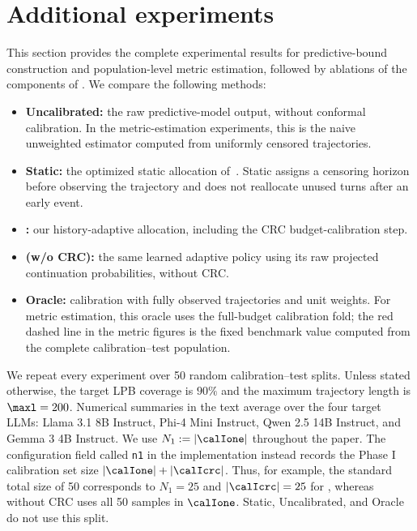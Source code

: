 \section{Additional experiments}
\label{sec:additional_experiments}

This section provides the complete experimental results for predictive-bound
construction and population-level metric estimation, followed by ablations of
the components of \ttmethod.  We compare the following methods:
\begin{itemize}
    \item \textbf{Uncalibrated:} the raw predictive-model output, without
    conformal calibration.  In the metric-estimation experiments, this is the
    naive unweighted estimator computed from uniformly censored trajectories.
    \item \textbf{Static:} the optimized static allocation
    of~\citet{davidov2026calibrated}.  Static assigns a censoring horizon before
    observing the trajectory and does not reallocate unused turns after an
    early event.
    \item \textbf{\ttmethod:} our history-adaptive allocation, including the
    CRC budget-calibration step.
    \item \textbf{\ttmethod (w/o CRC):} the same learned adaptive policy using
    its raw projected continuation probabilities, without CRC.
    \item \textbf{Oracle:} calibration with fully observed trajectories and
    unit weights.  For metric estimation, this oracle uses the full-budget
    calibration fold; the red dashed line in the metric figures is the fixed
    benchmark value computed from the complete calibration--test population.
\end{itemize}

We repeat every experiment over 50 random calibration--test splits.  Unless
stated otherwise, the target LPB coverage is $90\%$ and the maximum trajectory
length is $\maxl=200$.  Numerical summaries in the text average over the four
target LLMs: Llama 3.1 8B Instruct, Phi-4 Mini Instruct, Qwen 2.5 14B
Instruct, and Gemma 3 4B Instruct.  We use $N_1:=|\calIone|$ throughout the paper.  The
configuration field called \texttt{n1} in the implementation instead records
the Phase I calibration set size $|\calIone|+|\calIcrc|$. Thus, for example,
the standard total size of 50 corresponds to $N_1=25$ and
$|\calIcrc|=25$ for \ttmethod, whereas \ttmethod without CRC uses all 50
samples in $\calIone$.  Static, Uncalibrated, and Oracle do not use this split.

